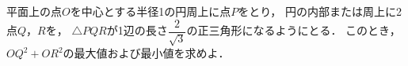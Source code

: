 \documentclass[../../main.tex]{subfiles}
\begin{document}
平面上の点$O$を中心とする半径1の円周上に点$P$をとり，
円の内部または周上に2点$Q$，$R$を，
$\triangle PQR$が1辺の長さ$\displaystyle\dfrac{2}{\sqrt3}$の正三角形になるようにとる．
このとき，${OQ}^2+{OR}^2$の最大値および最小値を求めよ．
\end{document}
